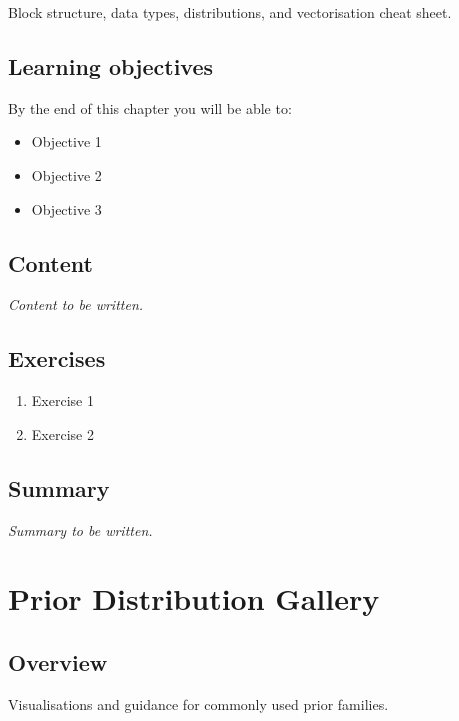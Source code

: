 \documentclass[
  11pt,
  a4paper,
  oneside,
  openany]{scrbook}
\providecommand{\tightlist}{%
  \setlength{\itemsep}{0pt}\setlength{\parskip}{0pt}}\usepackage{longtable,booktabs,array}
\begin{document}
Block structure, data types, distributions, and vectorisation cheat
sheet.

\section{Learning objectives}\label{learning-objectives-16}

By the end of this chapter you will be able to:

\begin{itemize}
\tightlist
\item[$\square$]
  Objective 1
\item[$\square$]
  Objective 2
\item[$\square$]
  Objective 3
\end{itemize}

\section{Content}\label{content-15}

\emph{Content to be written.}

\section{Exercises}\label{exercises-16}

\begin{enumerate}
\def\labelenumi{\arabic{enumi}.}
\tightlist
\item
  Exercise 1
\item
  Exercise 2
\end{enumerate}

\section{Summary}\label{summary-16}

\emph{Summary to be written.}

\chapter{Prior Distribution Gallery}\label{prior-distribution-gallery}

\section{Overview}\label{overview-17}

Visualisations and guidance for commonly used prior families.
\end{document}
